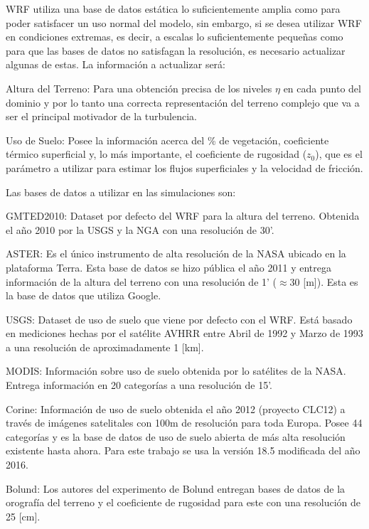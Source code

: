 WRF utiliza una base de datos estática lo suficientemente amplia como para poder satisfacer un uso normal del modelo, sin embargo, si se desea utilizar WRF en condiciones extremas, es decir, a escalas lo suficientemente pequeñas como para que las bases de datos no satisfagan la resolución, es necesario actualizar algunas de estas. La información a actualizar será:
\begin{itemize*}
	\item Altura del Terreno: Para una obtención precisa de los niveles $\eta$ en cada punto del dominio y por lo tanto una correcta representación del terreno complejo que va a ser el principal motivador de la turbulencia.
	\item Uso de Suelo: Posee la información acerca del \% de vegetación, coeficiente térmico superficial y, lo más importante, el coeficiente de rugosidad ($z_0$), que es el parámetro a utilizar para estimar los flujos superficiales y la velocidad de fricción.
\end{itemize*}
Las bases de datos a utilizar en las simulaciones son:
\begin{itemize*}
	\item GMTED2010: Dataset por defecto del WRF para la altura del terreno. Obtenida el año 2010 por la USGS y la NGA con una resolución de 30'.
	\item ASTER: Es el único instrumento de alta resolución de la NASA ubicado en la plataforma Terra. Esta base de datos se hizo pública el año 2011 y entrega información de la altura del terreno con una resolución de 1' ($\approx 30$ [m]). Esta es la base de datos que utiliza Google.
	\item USGS: Dataset de uso de suelo que viene por defecto con el WRF. Está basado en mediciones hechas por el satélite AVHRR entre Abril de 1992 y Marzo de 1993 a una resolución de aproximadamente 1 [km].
	\item MODIS: Información sobre uso de suelo obtenida por lo satélites de la NASA. Entrega información en 20 categorías a una resolución de 15'.
	\item Corine: Información de uso de suelo obtenida el año 2012 (proyecto CLC12) a través de imágenes satelitales con 100m de resolución para toda Europa. Posee 44 categorías y es la base de datos de uso de suelo abierta de más alta resolución existente hasta ahora. Para este trabajo se usa la versión 18.5 modificada del año 2016.
	\item Bolund: Los autores del experimento de Bolund entregan bases de datos de la orografía del terreno y el coeficiente de rugosidad para este con una resolución de 25 [cm].
\end{itemize*}
